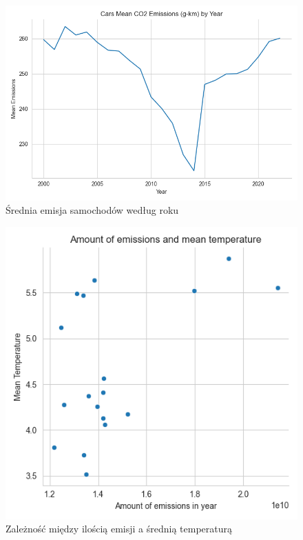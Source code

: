\documentclass[9pt,a4paper,twoside]{rho}
\begin{document}
        \begin{figure}[H]
            \centering
            \includegraphics[width=1\columnwidth]{plots/Cars Mean CO2 Emissions (g-km) by Year.png}
            \caption{Średnia emisja samochodów według roku}
            \label{fig:cars_mean_emissions_by_year}
        \end{figure}
    
        \begin{figure}[H]
            \centering
            \includegraphics[width=1\columnwidth]{plots/Amount of emissions and mean temperature.png}
            \caption{Zależność między ilością emisji a średnią temperaturą}
            \label{fig:amount_emiss_vs_mean_temp}
        \end{figure}
    
\end{document}
